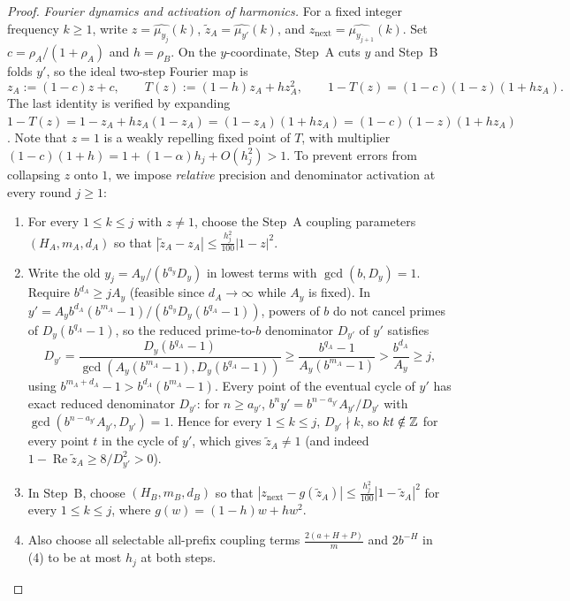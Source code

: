 \documentclass[11pt]{article}
\begin{document}
\begin{proof}
\emph{Fourier dynamics and activation of harmonics.} For a fixed integer frequency $k\ge1$, write $z=\widehat{\mu_{y_j}}(k)$, $\widetilde z_A=\widehat{\mu_{y'}}(k)$, and $z_{\mathrm{next}}=\widehat{\mu_{y_{j+1}}}(k)$. Set $c=\rho_A/(1+\rho_A)$ and $h=\rho_B$. On the $y$-coordinate, Step~A cuts $y$ and Step~B folds $y'$, so the ideal two-step Fourier map is
\begin{equation}\label{eq:fourier-map}
z_A:=(1-c)z+c,\qquad
T(z):=(1-h)z_A+hz_A^2,\qquad
1-T(z)=(1-c)(1-z)(1+hz_A).
\end{equation}
The last identity is verified by expanding $1-T(z)=1-z_A+hz_A(1-z_A)=(1-z_A)(1+hz_A)=(1-c)(1-z)(1+hz_A)$. Note that $z=1$ is a weakly repelling fixed point of $T$, with multiplier $(1-c)(1+h)=1+(1-\alpha)h_j+O(h_j^2)>1$. To prevent errors from collapsing $z$ onto $1$, we impose \emph{relative} precision and denominator activation at every round $j\ge1$:
\begin{enumerate}[label=\textup{(\alph*)},nosep]
\item For every $1\le k\le j$ with $z\ne1$, choose the Step~A coupling parameters $(H_A,m_A,d_A)$ so that $|\widetilde z_A-z_A|\le\frac{h_j^2}{100}|1-z|^2$.
\item Write the old $y_j=A_y/(b^{a_y}D_y)$ in lowest terms with $\gcd(b,D_y)=1$. Require $b^{d_A}\ge jA_y$ (feasible since $d_A\to\infty$ while $A_y$ is fixed). In $y'=A_yb^{d_A}(b^{m_A}-1)/(b^{a_y}D_y(b^{q_A}-1))$, powers of $b$ do not cancel primes of $D_y(b^{q_A}-1)$, so the reduced prime-to-$b$ denominator $D_{y'}$ of $y'$ satisfies
\begin{equation}\label{eq:den-growth}
D_{y'}=\frac{D_y(b^{q_A}-1)}{\gcd(A_y(b^{m_A}-1),D_y(b^{q_A}-1))}\ge\frac{b^{q_A}-1}{A_y(b^{m_A}-1)}>\frac{b^{d_A}}{A_y}\ge j,
\end{equation}
using $b^{m_A+d_A}-1>b^{d_A}(b^{m_A}-1)$. Every point of the eventual cycle of $y'$ has exact reduced denominator $D_{y'}$: for $n\ge a_{y'}$, $b^ny'=b^{n-a_{y'}}A_{y'}/D_{y'}$ with $\gcd(b^{n-a_{y'}}A_{y'},D_{y'})=1$. Hence for every $1\le k\le j$, $D_{y'}\nmid k$, so $kt\notin\mathbb Z$ for every point $t$ in the cycle of $y'$, which gives $\widetilde z_A\ne1$ (and indeed $1-\operatorname{Re}\widetilde z_A\ge 8/D_{y'}^2>0$).
\item In Step~B, choose $(H_B,m_B,d_B)$ so that $|z_{\mathrm{next}}-g(\widetilde z_A)|\le\frac{h_j^2}{100}|1-\widetilde z_A|^2$ for every $1\le k\le j$, where $g(w)=(1-h)w+hw^2$.
\item Also choose all selectable all-prefix coupling terms $\frac{2(a+H+P)}{m}$ and $2b^{-H}$ in (4) to be at most $h_j$ at both steps.
\end{enumerate}


\end{proof}
\end{document}
